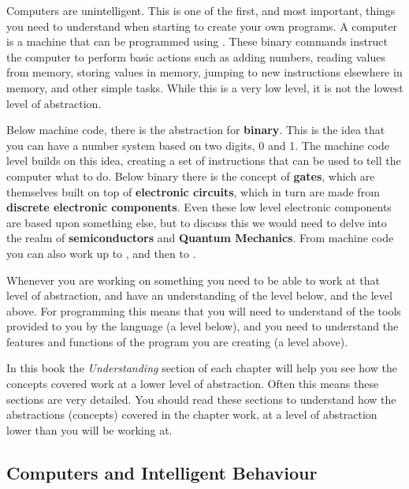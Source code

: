 Computers are unintelligent. This is one of the first, and most important, things you need to understand when starting to create your own programs. A computer is a machine that can be programmed using . These binary commands instruct the computer to perform basic actions such as adding numbers, reading values from memory, storing values in memory, jumping to new instructions elsewhere in memory, and other simple tasks. While this is a very low level, it is not the lowest level of abstraction.

Below machine code, there is the abstraction for \textbf{binary}. This is the idea that you can have a number system based on two digits, 0 and 1. The machine code level builds on this idea, creating a set of instructions that can be used to tell the computer what to do. Below binary there is the concept of \textbf{gates}, which are themselves built on top of \textbf{electronic circuits}, which in turn are made from \textbf{discrete electronic components}. Even these low level electronic components are based upon something else, but to discuss this we would need to delve into the realm of \textbf{semiconductors} and \textbf{Quantum Mechanics}. From machine code you can also work up to , and then to .

Whenever you are working on something you need to be able to work at that level of abstraction, and have an understanding of the level below, and the level above. For programming this means that you will need to understand of the tools provided to you by the language (a level below), and you need to understand the features and functions of the program you are creating (a level above).

In this book the \emph{Understanding} section of each chapter will help you see how the concepts covered work at a lower level of abstraction. Often this means these sections are very detailed. You should read these sections to understand how the abstractions (concepts) covered in the chapter work, at a level of abstraction lower than you will be working at.

\clearpage
\subsection{Computers and Intelligent Behaviour} %
\label{sub:computers_and_intelligent_behaviour}

